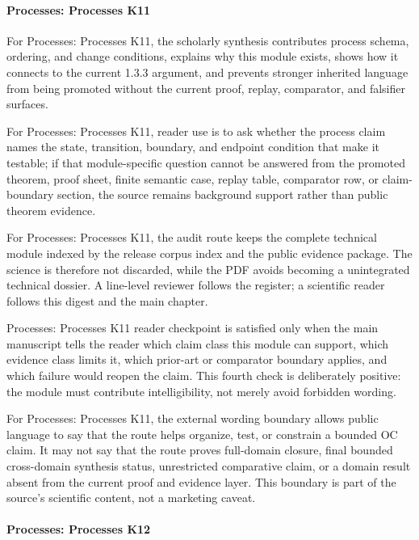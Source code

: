 \paragraph{Processes: Processes K11}

For Processes: Processes K11, the scholarly synthesis contributes process schema, ordering, and change conditions, explains why this module exists, shows how it connects to the current 1.3.3 argument, and prevents stronger inherited language from being promoted without the current proof, replay, comparator, and falsifier surfaces.


For Processes: Processes K11, reader use is to ask whether the process claim names the state, transition, boundary, and endpoint condition that make it testable; if that module-specific question cannot be answered from the promoted theorem, proof sheet, finite semantic case, replay table, comparator row, or claim-boundary section, the source remains background support rather than public theorem evidence.


For Processes: Processes K11, the audit route keeps the complete technical module indexed by the release corpus index and the public evidence package. The science is therefore not discarded, while the PDF avoids becoming a unintegrated technical dossier. A line-level reviewer follows the register; a scientific reader follows this digest and the main chapter.


Processes: Processes K11 reader checkpoint is satisfied only when the main manuscript tells the reader which claim class this module can support, which evidence class limits it, which prior-art or comparator boundary applies, and which failure would reopen the claim. This fourth check is deliberately positive: the module must contribute intelligibility, not merely avoid forbidden wording.


For Processes: Processes K11, the external wording boundary allows public language to say that the route helps organize, test, or constrain a bounded OC claim. It may not say that the route proves full-domain closure, final bounded cross-domain synthesis status, unrestricted comparative claim, or a domain result absent from the current proof and evidence layer. This boundary is part of the source's scientific content, not a marketing caveat.


\paragraph{Processes: Processes K12}

